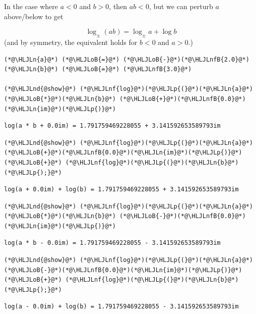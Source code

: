 \documentclass[12pt,a4paper]{article}
\newcommand{\HLJLn}[1]{#1}
\newcommand{\HLJLnd}[1]{\textcolor[RGB]{214,102,97}{#1}}
\newcommand{\HLJLnf}[1]{\textcolor[RGB]{66,102,213}{#1}}
\newcommand{\HLJLnfB}[1]{\textcolor[RGB]{59,151,46}{#1}}
\newcommand{\HLJLoB}[1]{\textcolor[RGB]{102,102,102}{\textbf{#1}}}
\newcommand{\HLJLp}[1]{#1}
\begin{document}
In the case where $a < 0$ and $b > 0$, then $a b < 0$, but we can perturb $a$ above/below to get

\[
\log_\pm(a b) = \log_\pm a + \log b
\]
(and by symmetry, the equivalent holds for $b < 0$ and $a > 0$.)


\begin{lstlisting}
(*@\HLJLn{a}@*) (*@\HLJLoB{=}@*) (*@\HLJLoB{-}@*)(*@\HLJLnfB{2.0}@*)
(*@\HLJLn{b}@*) (*@\HLJLoB{=}@*) (*@\HLJLnfB{3.0}@*)

(*@\HLJLnd{@show}@*) (*@\HLJLnf{log}@*)(*@\HLJLp{(}@*)(*@\HLJLn{a}@*)(*@\HLJLoB{*}@*)(*@\HLJLn{b}@*) (*@\HLJLoB{+}@*)(*@\HLJLnfB{0.0}@*)(*@\HLJLn{im}@*)(*@\HLJLp{)}@*)
\end{lstlisting}

\begin{lstlisting}
log(a * b + 0.0im) = 1.791759469228055 + 3.141592653589793im
\end{lstlisting}


\begin{lstlisting}
(*@\HLJLnd{@show}@*) (*@\HLJLnf{log}@*)(*@\HLJLp{(}@*)(*@\HLJLn{a}@*)(*@\HLJLoB{+}@*)(*@\HLJLnfB{0.0}@*)(*@\HLJLn{im}@*)(*@\HLJLp{)}@*) (*@\HLJLoB{+}@*) (*@\HLJLnf{log}@*)(*@\HLJLp{(}@*)(*@\HLJLn{b}@*)(*@\HLJLp{);}@*)
\end{lstlisting}

\begin{lstlisting}
log(a + 0.0im) + log(b) = 1.791759469228055 + 3.141592653589793im
\end{lstlisting}


\begin{lstlisting}
(*@\HLJLnd{@show}@*) (*@\HLJLnf{log}@*)(*@\HLJLp{(}@*)(*@\HLJLn{a}@*)(*@\HLJLoB{*}@*)(*@\HLJLn{b}@*) (*@\HLJLoB{-}@*)(*@\HLJLnfB{0.0}@*)(*@\HLJLn{im}@*)(*@\HLJLp{)}@*)
\end{lstlisting}

\begin{lstlisting}
log(a * b - 0.0im) = 1.791759469228055 - 3.141592653589793im
\end{lstlisting}


\begin{lstlisting}
(*@\HLJLnd{@show}@*) (*@\HLJLnf{log}@*)(*@\HLJLp{(}@*)(*@\HLJLn{a}@*)(*@\HLJLoB{-}@*)(*@\HLJLnfB{0.0}@*)(*@\HLJLn{im}@*)(*@\HLJLp{)}@*) (*@\HLJLoB{+}@*) (*@\HLJLnf{log}@*)(*@\HLJLp{(}@*)(*@\HLJLn{b}@*)(*@\HLJLp{);}@*)
\end{lstlisting}

\begin{lstlisting}
log(a - 0.0im) + log(b) = 1.791759469228055 - 3.141592653589793im
\end{lstlisting}
\end{document}
